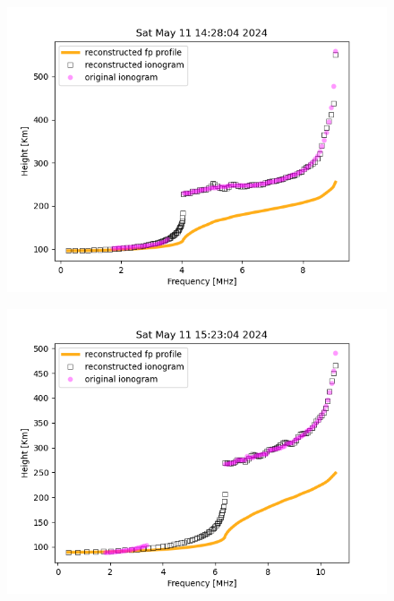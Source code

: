 \documentclass[aps,twocolumn,prb,showpacs,superscriptaddress]{revtex4-2}
\newcommand{\+}{\dagger}
\begin{document}
\begin{figure}[htbp]
    \begin{center}
    \includegraphics*[width=0.90\columnwidth]{images/115.png}
    \end{center}
    \caption{}
    \label{fig:06}
\end{figure}

\begin{figure}[htbp]
    \begin{center}
    \includegraphics*[width=0.90\columnwidth]{images/126.png}
    \end{center}
    \caption{}
    \label{fig:07}
\end{figure}
\end{document}
